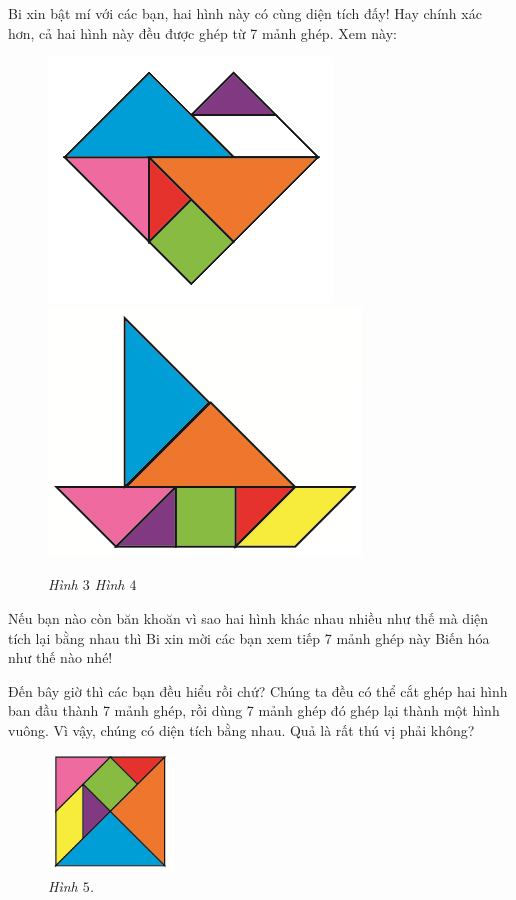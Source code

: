 	\begin{multicols}{2}
		Bi xin bật mí với các bạn, hai hình này có cùng diện tích đấy! Hay chính xác hơn, cả hai hình này đều được ghép từ 7 mảnh ghép. Xem này:
		\begin{figure}[H]
			\vspace*{5pt}
			\centering
			\captionsetup{labelformat=empty}
			\includegraphics[width=.4\linewidth]{imame3}\includegraphics[width=.4\linewidth]{image4}
			\caption{\small \it Hình $3$\hspace*{30pt} Hình $4$}
			\vspace*{-10pt}
		\end{figure}
	\end{multicols}
	Nếu bạn nào còn băn khoăn vì sao hai hình khác nhau nhiều như thế mà diện tích lại bằng nhau thì Bi xin mời các bạn xem tiếp 7 mảnh ghép này Biến hóa như thế nào nhé!
	\begin{multicols}{2}
		Đến bây giờ thì các bạn đều hiểu rồi chứ? Chúng ta đều có thể cắt ghép hai hình ban đầu thành 7 mảnh ghép, rồi dùng 7 mảnh ghép đó ghép lại thành một hình vuông. Vì vậy, chúng có diện tích bằng nhau. Quả là rất thú vị phải không?
		\begin{figure}[H]
			\vspace*{5pt}	
			\captionsetup{labelformat=empty}
			\centering
			\captionsetup{justification=raggedleft}
			\includegraphics[width =0.3\textwidth]{image5}
			\caption{\small\it Hình $5$.}
			\vspace*{-10pt}
		\end{figure}
	\end{multicols}
